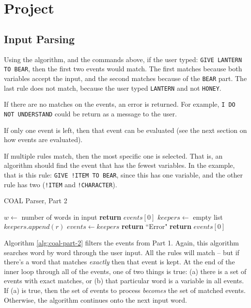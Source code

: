 \documentclass{article}
\newcommand{\enterProblemHeader}[1]{
}
\newcommand{\exitProblemHeader}[1]{
\nobreak\extramarks{#1}{}\nobreak
}
\newcounter{homeworkProblemCounter} %
\newcommand{\homeworkProblemName}{}
\newenvironment{homeworkProblem}[1][Problem \arabic{homeworkProblemCounter}]{ %
\stepcounter{homeworkProblemCounter} %
\renewcommand{\homeworkProblemName}{#1} %
\section{\homeworkProblemName} %
\enterProblemHeader{\homeworkProblemName} %
}{
\exitProblemHeader{\homeworkProblemName} %
}
\newcommand{\homeworkSectionName}{}
\newenvironment{homeworkSection}[1]{ %
\renewcommand{\homeworkSectionName}{#1} %
\subsection{\homeworkSectionName} %
\enterProblemHeader{\homeworkProblemName\ [\homeworkSectionName]} %
}{
\enterProblemHeader{\homeworkProblemName} %
}
\begin{document}
\begin{homeworkProblem}[Project]
\begin{homeworkSection}{Input Parsing}
	Using the algorithm, and the commands above, if the user typed: \texttt{GIVE LANTERN TO BEAR}, then the first two events would match. The first matches because both variables accept the input, and the second matches because of the \texttt{BEAR} part. The last rule does not match, because the user typed \texttt{LANTERN} and not \texttt{HONEY}.

	If there are no matches on the events, an error is returned. For example, \texttt{I DO NOT UNDERSTAND} could be return as a message to the user.

	If only one event is left, then that event can be evaluated (see the next section on how events are evaluated).

	If multiple rules match, then the most specific one is selected. That is, an algorithm should find the event that has the fewest variables. In the example, that is this rule: \texttt{GIVE !ITEM TO BEAR}, since this has one variable, and the other rule has two (\texttt{!ITEM} and \texttt{!CHARACTER}).

	\begin{algorithm}
		\caption{COAL Parser, Part 2}
		\label{alg:coal-part-2}
		\begin{algorithmic}
				\State $w \gets$ number of words in input
						\State \textbf{return} $events[0]$
					\EndIf
					\State $keepers \gets$ empty list
							\State $keepers.append(r)$
						\EndIf
					\EndFor
						\State $events \gets keepers$
					\EndIf
				\EndFor
					\State \textbf{return} ``Error"
				\EndIf
				\State \textbf{return} $events[0]$
			\EndProcedure
		\end{algorithmic}
	\end{algorithm}

	Algorithm \ref{alg:coal-part-2} filters the events from Part 1. Again, this algorithm searches word by word through the user input. All the rules will match -- but if there's a word that matches \textit{exactly} then that event is kept. At the end of the inner loop through all of the events, one of two things is true: (a) there is a set of events with exact matches, or (b) that particular word is a variable in all events. If (a) is true, then the set of events to process \textit{becomes} the set of matched events. Otherwise, the algorithm continues onto the next input word.


\end{homeworkSection}
\end{homeworkProblem}
\end{document}

